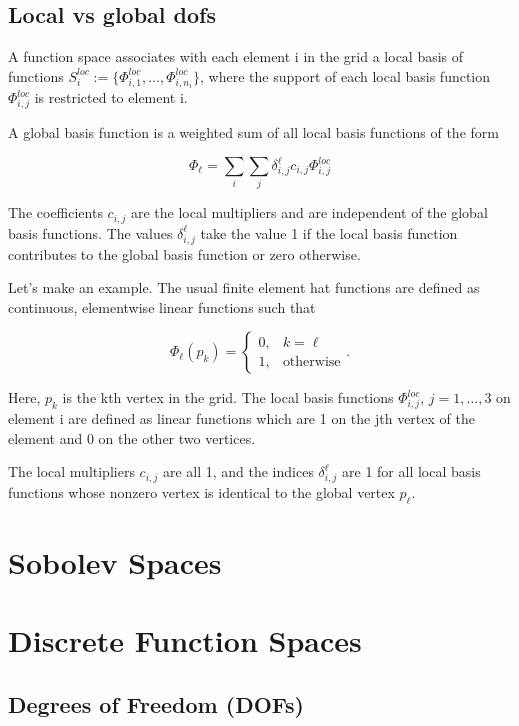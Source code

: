 \documentclass[a4paper]{book}
\begin{document}
\subsection{ Local vs global dofs}
A function space associates with each element i in the grid a local basis
of functions $S_i^{loc} := \{\Phi_{i, 1}^{loc}, \dots, \Phi_{i, n_i}^{loc}\}$,
where the support of each local basis function $\Phi_{i, j}^{loc}$ is
restricted to element i.

A global basis function is a weighted sum of all local
basis functions of the form

$$\Phi_{\ell} = \sum_{i}\sum_{j}\delta_{i, j}^{\ell}c_{i, j}\Phi_{i, j}^{loc}$$

The coefficients $c_{i, j}$ are the local multipliers and are
independent of the global basis functions. The
values $\delta_{i, j}^{\ell}$ take the value 1 if the local
basis function contributes to the global basis function or zero
otherwise.

Let's make an example. The usual finite element hat functions
are defined as continuous, elementwise linear functions such that

$$\Phi_{\ell}(p_k) = \begin{cases}0, & k = \ell\\
                                    1, &\text{otherwise}
                               \end{cases}.$$

Here, $p_k$ is the kth vertex in the grid. The local basis
functions $\Phi_{i, j}^{loc}$, $j=1, \dots, 3$ on element i
are defined as linear functions which are 1 on the jth vertex of the
element and 0 on the other two vertices.

The local multipliers $c_{i, j}$ are all 1, and the indices
$\delta_{i, j}^{\ell}$ are 1 for all local basis functions whose
nonzero vertex is identical to the global vertex $p_{\ell}$.


\section{Sobolev Spaces}



\section{Discrete Function Spaces}



\subsection{Degrees of Freedom (DOFs)}
\end{document}
